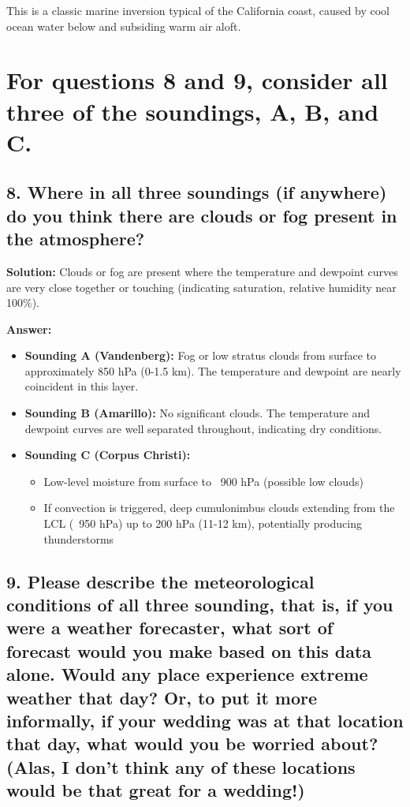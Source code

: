 \documentclass[letterpaper, 11pt]{article}
\newcommand{\1}{\mathds{1}}	%
\theoremstyle{definition}
\begin{document}
This is a classic marine inversion typical of the California coast, caused by cool ocean water below and subsiding warm air aloft.

\section*{For questions 8 and 9, consider all three of the soundings, A, B, and C.}

\subsection*{8. Where in all three soundings (if anywhere) do you think there are clouds or fog present in the atmosphere?}

\textbf{Solution:} Clouds or fog are present where the temperature and dewpoint curves are very close together or touching (indicating saturation, relative humidity near 100\%).

\textbf{Answer:}

\begin{itemize}
    \item \textbf{Sounding A (Vandenberg):} Fog or low stratus clouds from surface to approximately 850 hPa (0-1.5 km). The temperature and dewpoint are nearly coincident in this layer.
    
    \item \textbf{Sounding B (Amarillo):} No significant clouds. The temperature and dewpoint curves are well separated throughout, indicating dry conditions.
    
    \item \textbf{Sounding C (Corpus Christi):} 
    \begin{itemize}
        \item Low-level moisture from surface to ~900 hPa (possible low clouds)
        \item If convection is triggered, deep cumulonimbus clouds extending from the LCL (~950 hPa) up to 200 hPa (11-12 km), potentially producing thunderstorms
    \end{itemize}
\end{itemize}

\subsection*{9. Please describe the meteorological conditions of all three sounding, that is, if you were a weather forecaster, what sort of forecast would you make based on this data alone. Would any place experience extreme weather that day? Or, to put it more informally, if your wedding was at that location that day, what would you be worried about? (Alas, I don't think any of these locations would be that great for a wedding!)}
\end{document}
